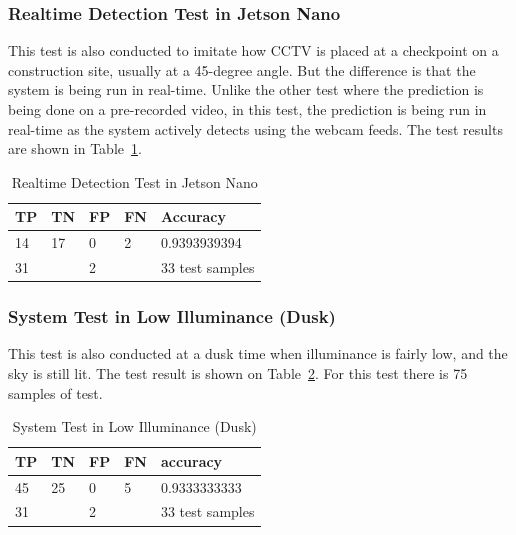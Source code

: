 \subsubsection{Realtime Detection Test in Jetson Nano}
\label{subsubsec:hedect_test_cctv_jetsonanno}

\par This test is also conducted to imitate how CCTV is placed at a checkpoint on a construction site, usually at a 45-degree angle. But the difference is that the system is being run in real-time. Unlike the other test where the prediction is being done on a pre-recorded video, in this test, the prediction is being run in real-time as the system actively detects using the webcam feeds. The test results are shown in Table~\ref{tb:systest_jetsonnano}.

\begin{table}
  \centering
  \caption{Realtime Detection Test in Jetson Nano}
  \label{tb:systest_jetsonnano}
  \begin{tabular}{|l|l|l|l|l|} 
  \hline
  TP & TN                    & FP & FN                & Accuracy         \\ 
  \hline
  14 & 17                    & 0  & 2                 & 0.9393939394     \\ 
  \hline
  \multicolumn{2}{|l|}{31}   & \multicolumn{2}{l|}{2} & 33 test samples  \\
  \hline
  \end{tabular}
\end{table}

\subsubsection{System Test in Low Illuminance (Dusk)}
\label{subsubsec:hedect_test_lowillum_dusk}

\par This test is also conducted at a dusk time when illuminance is fairly low, and the sky is still lit. The test result is shown on Table~\ref{tb:systest_lowillum_dusk}. For this test there is 75 samples of test.

\begin{table}
  \centering
  \caption{System Test in Low Illuminance (Dusk)}
  \label{tb:systest_lowillum_dusk}
  \begin{tabular}{|l|l|l|l|l|} 
  \hline
  TP & TN                    & FP & FN                & accuracy         \\ 
  \hline
  45 & 25                    & 0  & 5                 & 0.9333333333    \\ 
  \hline
  \multicolumn{2}{|l|}{31}   & \multicolumn{2}{l|}{2} & 33 test samples  \\
  \hline
  \end{tabular}
\end{table}

